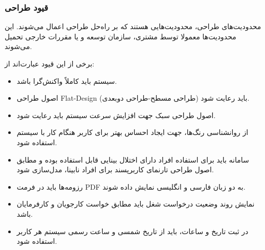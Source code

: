 \documentclass[12pt]{article}
\begin{document}
	\subsubsection{قیود طراحی}
	محدودیت‌های طراحی، محدودیت‌هایی هستند که بر راه‌حل طراحی اعمال می‌شوند. این محدودیت‌ها معمولا توسط مشتری، سازمان توسعه و یا مقررات خارجی تحمیل می‌شوند.

	برخی از این قیود عبارت‌اند از:
	\begin{itemize}
		\item
		سیستم باید کاملاً واکنش‌گرا باشد.
		\item
		اصول طراحی Flat-Design (طراحی مسطح-طراحی دوبعدی) باید رعایت شود.
		\item
		اصول طراحی سبک جهت افزایش سرعت سیستم باید رعایت شود.
		\item
		از روانشناسی رنگ‌ها، جهت ایجاد احساس بهتر برای کاربر هنگام کار با سیستم استفاده شود.
		\item
		سامانه باید برای استفاده افراد دارای اختلال بینایی قابل استفاده بوده و مطابق اصول طراحی تارنمای کاربر‌پسند برای افراد نابینا، مدل‌سازی شود.
		\item
		رزومه‌ها باید در فرمت PDF به دو زبان فارسی و انگلیسی نمایش داده شوند.
		\item
		نمایش روند وضعیت درخواست شغل باید مطابق خواست کارجویان و کارفرمایان باشد.
		\item
		در ثبت تاریخ و ساعات، باید از تاریخ شمسی و ساعت رسمی سیستم هر کاربر استفاده شود.
	\end{itemize}
\end{document}
